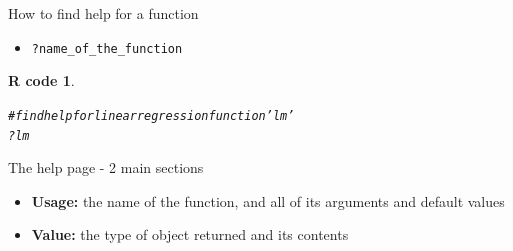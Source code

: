 \documentclass[11pt]{beamer}\usepackage[]{graphicx}\usepackage[]{color}
\makeatletter
\newcommand{\hlcom}[1]{\textcolor[rgb]{0.588,0.588,0.588}{#1}}%
\newcommand{\hlopt}[1]{\textcolor[rgb]{0.196,0.196,0.196}{#1}}%
\newcommand{\hlstd}[1]{\textcolor[rgb]{0.196,0.196,0.196}{#1}}%
\newenvironment{kframe}{%
 \def\at@end@of@kframe{}%
 \ifinner\ifhmode%
  \def\at@end@of@kframe{\end{minipage}}%
  \begin{minipage}{\columnwidth}%
 \fi\fi%
 \def\FrameCommand##1{\hskip\@totalleftmargin \hskip-\fboxsep
 \colorbox{shadecolor}{##1}\hskip-\fboxsep
     \hskip-\linewidth \hskip-\@totalleftmargin \hskip\columnwidth}%
 \MakeFramed {\advance\hsize-\width
   \@totalleftmargin\z@ \linewidth\hsize
   \@setminipage}}%
 {\par\unskip\endMakeFramed%
 \at@end@of@kframe}
\newenvironment{knitrout}{}{} %
\newtheorem{rcode}{R code}[section]
\newcommand{\code}[1]{\texttt{#1}}
\makeatother
\begin{document}
\begin{frame}[fragile]{How to find help for a function}
\begin{itemize}
  \setlength\itemsep{2em}
\item \mbox{\texttt{?name\_of\_the\_function}}
\end{itemize}

\pause 
\begin{knitrout}
\color{fgcolor}\begin{kframe}
\begin{rcode}\label{unnamed-chunk-2}\begin{alltt}
\hlcom{# find help for linear regression function 'lm'}
\hlopt{?}\hlstd{lm}
\end{alltt}
\end{rcode}\end{kframe}
\end{knitrout}
\end{frame}


\begin{frame}{The help page - 2 main sections}
\begin{itemize}
  \setlength\itemsep{2em}
\item \textbf{Usage:} the name of the function, and all of its arguments and default values
\pause \item \textbf{Value:} the type of object returned and its contents
\end{itemize}
\end{frame}


\end{document}
